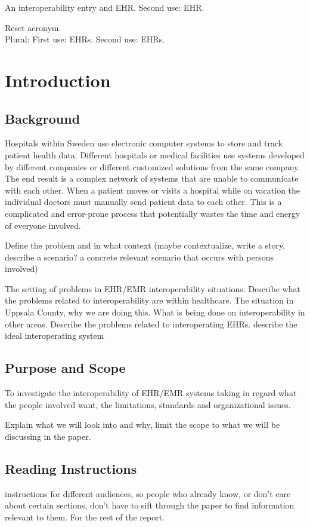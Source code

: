\documentclass[14pt]{article}
\begin{document}
An \gls{interoperability} entry and \gls{EHR}. Second use: \gls{EHR}.

Reset acronym. \\
Plural: First use: \glspl{EHR}. Second use: \glspl{EHR}.

\newpage

\section{Introduction}

\subsection{Background}
Hospitals within Sweden use electronic computer systems to store and track patient health data. Different hospitals or medical facilities use systems developed by different companies or different customized solutions from the same company. The end result is a complex network of systems that are unable to communicate with each other. When a patient moves or visits a hospital while on vacation the individual doctors must manually send patient data to each other. This is a complicated and error-prone process that potentially wastes the time and energy of everyone involved.

Define the problem and in what context (maybe contextualize, write a story, describe a scenario? a concrete relevant scenario that occurs with persons involved)

The setting of problems in \gls{EHR}/EMR \gls{interoperability} situations. Describe what the problems related to \gls{interoperability} are within healthcare. The situation in Uppsala County, why we are doing this. What is being done on \gls{interoperability} in other areas. Describe the problems related to interoperating \glspl{EHR}.
describe the ideal interoperating system

\subsection{Purpose and Scope}
To investigate the \gls{interoperability} of
\gls{EHR}/EMR systems taking in regard what
the people involved want, the limitations,
standards and organizational issues.

Explain what we will look into and why, limit the scope to what we will be discussing in the paper.

\subsection{Reading Instructions}
instructions for different audiences, so people who already know, or don't care about certain sections, don't have to sift through the paper to find information relevant to them. For the rest of the report.
\end{document}

